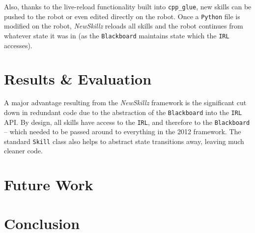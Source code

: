 Also, thanks to the live-reload functionality built into \texttt{cpp\_glue}, new skills can be pushed to the robot or even edited directly on the robot. Once a \verb!Python! file is modified on the robot, \textit{NewSkillz} reloads all skills and the robot continues from whatever state it was in (as the \texttt{Blackboard} maintains state which the \texttt{IRL} accesses).

\section{Results \& Evaluation}

A major advantage resulting from the \textit{NewSkillz} framework is the significant cut down in redundant code due to the abstraction of the \texttt{Blackboard} into the \texttt{IRL} API. By design, all skills have access to the \texttt{IRL}, and therefore to the \texttt{Blackboard} -- which needed to be passed around to everything in the 2012 framework. The standard \texttt{Skill} class also helps to abstract state transitions away, leaving much cleaner code.

\section{Future Work}


\section{Conclusion}

